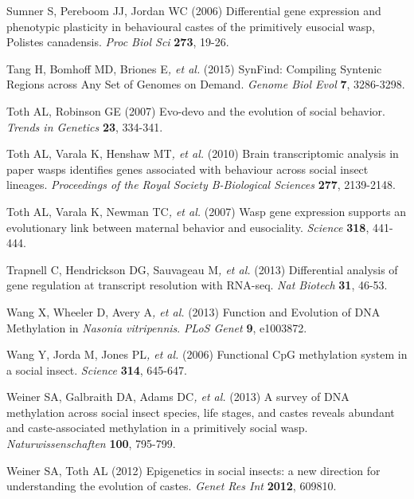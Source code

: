 \documentclass[]{article}
\begin{document}
\protect\hypertarget{ux5fENREFux5f59}{}{}Sumner S, Pereboom JJ, Jordan
WC (2006) Differential gene expression and phenotypic plasticity in
behavioural castes of the primitively eusocial wasp, Polistes
canadensis. \emph{Proc Biol Sci} \textbf{273}, 19-26.

\protect\hypertarget{ux5fENREFux5f60}{}{}Tang H, Bomhoff MD, Briones
E\emph{, et al.} (2015) SynFind: Compiling Syntenic Regions across Any
Set of Genomes on Demand. \emph{Genome Biol Evol} \textbf{7}, 3286-3298.

\protect\hypertarget{ux5fENREFux5f61}{}{}Toth AL, Robinson GE (2007)
Evo-devo and the evolution of social behavior. \emph{Trends in Genetics}
\textbf{23}, 334-341.

\protect\hypertarget{ux5fENREFux5f62}{}{}Toth AL, Varala K, Henshaw
MT\emph{, et al.} (2010) Brain transcriptomic analysis in paper wasps
identifies genes associated with behaviour across social insect
lineages. \emph{Proceedings of the Royal Society B-Biological Sciences}
\textbf{277}, 2139-2148.

\protect\hypertarget{ux5fENREFux5f63}{}{}Toth AL, Varala K, Newman
TC\emph{, et al.} (2007) Wasp gene expression supports an evolutionary
link between maternal behavior and eusociality. \emph{Science}
\textbf{318}, 441-444.

\protect\hypertarget{ux5fENREFux5f64}{}{}Trapnell C, Hendrickson DG,
Sauvageau M\emph{, et al.} (2013) Differential analysis of gene
regulation at transcript resolution with RNA-seq. \emph{Nat Biotech}
\textbf{31}, 46-53.

\protect\hypertarget{ux5fENREFux5f65}{}{}Wang X, Wheeler D, Avery
A\emph{, et al.} (2013) Function and Evolution of DNA Methylation in
\emph{Nasonia vitripennis}. \emph{PLoS Genet} \textbf{9}, e1003872.

\protect\hypertarget{ux5fENREFux5f66}{}{}Wang Y, Jorda M, Jones
PL\emph{, et al.} (2006) Functional CpG methylation system in a social
insect. \emph{Science} \textbf{314}, 645-647.

\protect\hypertarget{ux5fENREFux5f67}{}{}Weiner SA, Galbraith DA, Adams
DC\emph{, et al.} (2013) A survey of DNA methylation across social
insect species, life stages, and castes reveals abundant and
caste-associated methylation in a primitively social wasp.
\emph{Naturwissenschaften} \textbf{100}, 795-799.

\protect\hypertarget{ux5fENREFux5f68}{}{}Weiner SA, Toth AL (2012)
Epigenetics in social insects: a new direction for understanding the
evolution of castes. \emph{Genet Res Int} \textbf{2012}, 609810.
\end{document}
